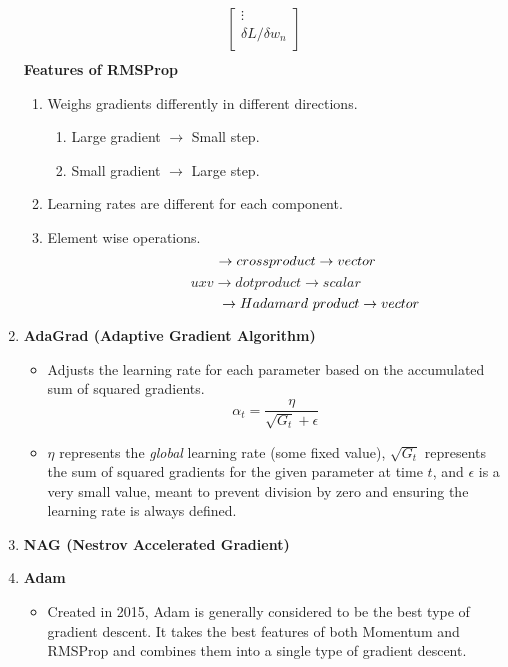 \begin{enumerate}
\begin{align*}
\begin{bmatrix}
           \vdots   \\
           \delta L/\delta w_n    \\
         \end{bmatrix} \\
    \end{align*}
    \textbf{Features of RMSProp}
    \begin{enumerate}
        \item Weighs gradients differently in different directions.
        \begin{enumerate}
            \item Large gradient $\rightarrow$ Small step.
            \item Small gradient $\rightarrow$ Large step.
        \end{enumerate}
        \item Learning rates are different for each component.
        \item Element wise operations.
        \[
        \hspace{1.1cm} \rightarrow cross product \rightarrow vector
        \]
        \[
        uxv \rightarrow dot product \rightarrow scalar
        \]
        \[
        \hspace{2.3cm} \rightarrow Hadamard\ product \rightarrow vector
        \]
    \end{enumerate}
    \item \textbf{AdaGrad (Adaptive Gradient Algorithm)}
    \begin{itemize}
        \item Adjusts the learning rate for each parameter based on the accumulated sum of squared gradients.
        \[
        \alpha_t = \frac{\eta}{\sqrt{G_t}+\epsilon}
        \]
        \item $\eta$ represents the \textit{global} learning rate (some fixed value), $\sqrt{G_t}$ represents the sum of squared gradients for the given parameter at time $t$, and $\epsilon$ is a very small value, meant to prevent division by zero and ensuring the learning rate is always defined.
    \end{itemize}
    \item \textbf{NAG (Nestrov Accelerated Gradient)}
    \item \textbf{Adam}
    \begin{itemize}
        \item Created in 2015, Adam is generally considered to be the best type of gradient descent. It takes the best features of both Momentum and RMSProp and combines them into a single type of gradient descent.
    \end{itemize}
\end{enumerate}
